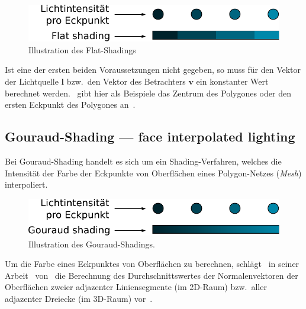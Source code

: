 \begin{figure}[H]
    \centering
    \includegraphics{img/flat_shading.pdf}
    \caption{Illustration des Flat-Shadings\protect\footnotemark}\label{
        fig:flat_shading_illustration}
\end{figure}

Ist eine der ersten beiden Voraussetzungen nicht gegeben, so muss für
den Vektor der Lichtquelle $\bm{l}$ bzw.\ den Vektor des Betrachters
$\bm{v}$ ein konstanter Wert berechnet
werden.~\citeauthor{foley_computer_1996} gibt hier als Beispiele das
Zentrum des Polygones oder den ersten Eckpunkt des Polygones
an~\parencite[S. 735]{foley_computer_1996}.

\subsection{Gouraud-Shading --- face interpolated lighting}
\label{subsec:gouraud_shading}

Bei Gouraud-Shading handelt es sich um ein Shading-Verfahren, welches
die Intensität der Farbe der Eckpunkte von Oberflächen eines
Polygon-Netzes (\textit{Mesh}) interpoliert.

\begin{figure}[H]
    \centering
    \includegraphics{img/gouraud_shading.pdf}
    \caption{Illustration des Gouraud-Shadings\protect\footnotemark.}\label{
        fig:gouraud_shading_illustration}
\end{figure}

Um die Farbe eines Eckpunktes von Oberflächen zu berechnen,
schlägt~\citeauthor{gouraud_continuous_1971} in seiner
Arbeit~
von~\citeyear{gouraud_continuous_1971} die Berechnung des
Durchschnittswertes der Normalenvektoren der Oberflächen zweier
adjazenter Liniensegmente (im 2D-Raum) bzw.\  aller adjazenter Dreiecke
(im 3D-Raum) vor~\parencite[S. 92]{gouraud_continuous_1971}.

